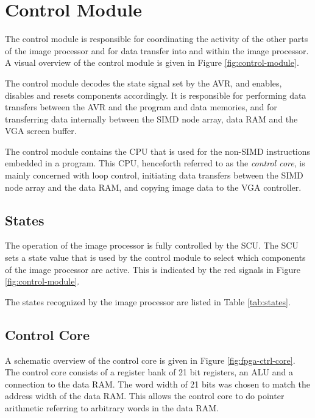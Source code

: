 \section{Control Module}

The control module is responsible for coordinating the activity of the
other parts of the image processor and for data transfer into and within
the image processor. A visual overview of the control module is given in
Figure \ref{fig:control-module}.



The control module decodes the state signal set by the AVR, and enables,
disables and resets components accordingly. It is responsible for performing
data transfers between the AVR and the program and data memories, and for
transferring data internally between the \ac{SIMD} node array, data \ac{RAM}
and the \ac{VGA} screen buffer. 

The control module contains the \ac{CPU} that is used for the non-\ac{SIMD}
instructions embedded in a program. This \ac{CPU}, henceforth referred to as the
\emph{control core}, is mainly concerned with loop control, initiating data
transfers between the \ac{SIMD} node array and the data RAM, and copying image
data to the \ac{VGA} controller.

\subsection{States}

The operation of the image processor is fully controlled by the \ac{SCU}. The
\ac{SCU} sets a state value that is used by the control module to select which
components of the image processor are active. This is indicated by the red
signals in Figure
\ref{fig:control-module}.

The states recognized by the image processor are listed in Table
\ref{tab:states}.



\subsection{Control Core}

A schematic overview of the control core is given in Figure
\ref{fig:fpga-ctrl-core}. The control core consists of a register bank
of 21 bit registers, an \ac{ALU} and a connection to the data \ac{RAM}. The word
width of 21 bits was chosen to match the address width of the data \ac{RAM}.
This allows the control core to do pointer arithmetic referring to
arbitrary words in the data \ac{RAM}.

